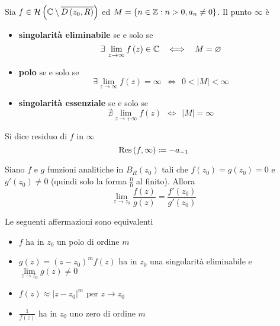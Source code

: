 \begin{thm}
Sia $f\in \mathcal{H} \left(\mathbb{C}  \setminus \overline{D\left( z_{0} ,R\right)}\right)$ ed $M=\left\{n\in \mathbb{Z}  :n >0,a_{n} \neq 0\right\}$. Il punto $\infty $ è

\begin{itemize}
\item \textbf{singolarità eliminabile} se e solo se\begin{equation*}
\exists \lim\limits _{z\rightarrow \infty } f\left( z\right) \in \CC  \ \ \iff \ \ M=\emptyset 
\end{equation*}
\item \textbf{polo} se e solo se\begin{equation*}
\exists \lim\limits _{z\rightarrow \infty } f\left( z\right) =\infty \ \ \iff \ \ 0< \left| M\right| < \infty 
\end{equation*}
\item \textbf{singolarità essenziale} se e solo se\begin{equation*}
\nexists \lim\limits _{z\rightarrow +\infty } f\left( z\right) \ \ \iff \ \ \left| M\right| =\infty 
\end{equation*}
\end{itemize}
\end{thm}
\begin{defn}
Si dice residuo di $f$ in $\infty $
\begin{equation*}
\operatorname{Res} \left( f,\infty \right) \coloneqq -a_{-1}
\end{equation*}
\end{defn}
\begin{thm}
[di De l'Hôpital] Siano $f$ e $g$ funzioni analitiche in $B_{R}\left( z_{0}\right)$ tali che $f\left( z_{0}\right) =g\left( z_{0}\right) =0$ e $g'\left( z_{0}\right) \neq 0$ (quindi solo la forma $\frac{0}{0}$ al finito). Allora
\begin{equation*}
\lim\limits _{z\rightarrow z_{0}}\frac{f\left( z\right)}{g\left( z\right)} =\frac{f'\left( z_{0}\right)}{g'\left( z_{0}\right)}
\end{equation*}
\end{thm}
\begin{thm}
Le seguenti affermazioni sono equivalenti
\begin{itemize}
\item $f$ ha in $z_{0}$ un polo di ordine $m$
\item $g\left( z\right) =\left( z-z_{0}\right)^{m} f\left( z\right)$ ha in $z_{0}$ una singolarità eliminabile e $\lim\limits _{z\rightarrow z_{0}} g\left( z\right) \neq 0$
\item $f\left( z\right) \approx \left| z-z_{0}\right| ^{m}$ per $z\rightarrow z_{0}$
\item $\frac{1}{f\left( z\right)}$ ha in $z_{0}$ uno zero di ordine $m$
\end{itemize}
\end{thm}

